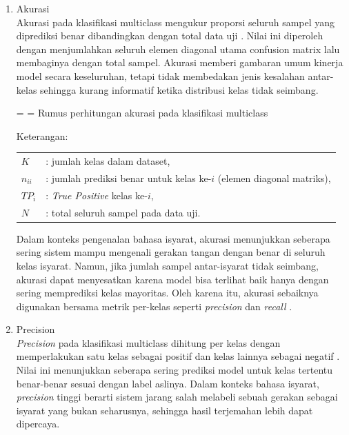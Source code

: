 \begin{enumerate}
	\item Akurasi \\
	Akurasi pada klasifikasi multiclass mengukur proporsi seluruh sampel yang diprediksi benar dibandingkan dengan total data uji \cite{Raschka2020}. Nilai ini diperoleh dengan menjumlahkan seluruh elemen diagonal utama confusion matrix lalu membaginya dengan total sampel. Akurasi memberi gambaran umum kinerja model secara keseluruhan, tetapi tidak membedakan jenis kesalahan antar-kelas sehingga kurang informatif ketika distribusi kelas tidak seimbang.\\
	\vspace{0.5cm}
	\begin{equationcaptioned}[eq:2.accuracy]{
		 =  = 
	}{
		Rumus perhitungan akurasi pada klasifikasi multiclass
	}\end{equationcaptioned}
	\vspace{0.5cm}

	\noindent Keterangan:

\begingroup
	\footnotesize
\begin{tabular}{@{}ll}
	$K$ & : jumlah kelas dalam dataset, \\
	$n_{ii}$ & : jumlah prediksi benar untuk kelas ke-$i$ (elemen diagonal matriks), \\
	$TP_i$ & : \textit{True Positive} kelas ke-$i$, \\
	$N$ & : total seluruh sampel pada data uji. \\
	\end{tabular}
	\endgroup

	\vspace{0.5cm}
	Dalam konteks pengenalan bahasa isyarat, akurasi menunjukkan seberapa sering sistem mampu mengenali gerakan tangan dengan benar di seluruh kelas isyarat. Namun, jika jumlah sampel antar-isyarat tidak seimbang, akurasi dapat menyesatkan karena model bisa terlihat baik hanya dengan sering memprediksi kelas mayoritas. Oleh karena itu, akurasi sebaiknya digunakan bersama metrik per-kelas seperti \textit{precision} dan \textit{recall} \cite{Raschka2020}.\par


	\item Precision \\
	\textit{Precision} pada klasifikasi multiclass dihitung per kelas dengan memperlakukan satu kelas sebagai positif dan kelas lainnya sebagai negatif \cite{Raschka2020}. Nilai ini menunjukkan seberapa sering prediksi model untuk kelas tertentu benar-benar sesuai dengan label aslinya. Dalam konteks bahasa isyarat, \textit{precision} tinggi berarti sistem jarang salah melabeli sebuah gerakan sebagai isyarat yang bukan seharusnya, sehingga hasil terjemahan lebih dapat dipercaya.\par


\end{enumerate}
